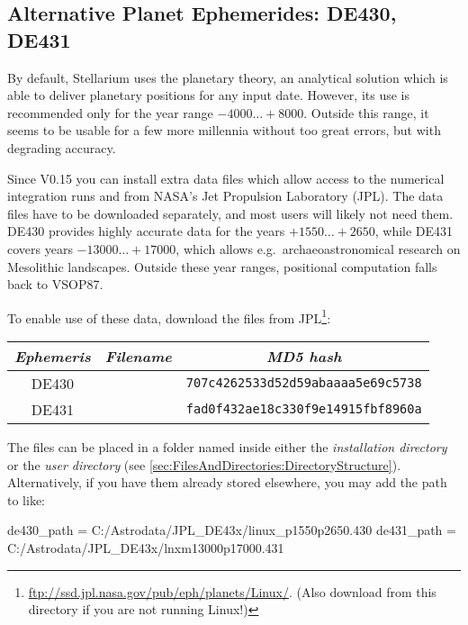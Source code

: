 \subsection{Alternative Planet Ephemerides: DE430, DE431}
\label{sec:ExtraData:ephemerides}

By default, Stellarium uses the  planetary theory,
an analytical solution which is able to deliver planetary positions
for any input date. However, its use is recommended only for the year
range $-4000\ldots+8000$. Outside this range, it seems to be usable
for a few more millennia without too great errors, but with degrading accuracy. 

Since V0.15 you can install extra data files which allow access to the
numerical integration runs  and 
from NASA's Jet Propulsion Laboratory (JPL). The data files have to be
downloaded separately, and most users will likely not need them. DE430
provides highly accurate data for the years $+1550\ldots+2650$, while
DE431 covers years $-13000\ldots+17000$, which allows e.g.\ 
archaeoastronomical research on Mesolithic landscapes. Outside these
year ranges, positional computation falls back to VSOP87.

To enable use of these data, download the files from
JPL\footnote{\url{ftp://ssd.jpl.nasa.gov/pub/eph/planets/Linux/}. (Also
  download from this directory if you are not running Linux!)}:

\begin{tabular}{ccc}
\toprule
\emph{Ephemeris}&\emph{Filename}& \emph{MD5 hash}\\\midrule
DE430& \file{linux\_p1550p2650.430} &\texttt{707c4262533d52d59abaaaa5e69c5738}\\
DE431& \file{lnxm13000p17000.431}   &\texttt{fad0f432ae18c330f9e14915fbf8960a}\\\bottomrule
\end{tabular}


The files can be placed in a folder named  inside either
the \emph{installation directory} or the \emph{user directory}
(see \ref{sec:FilesAndDirectories:DirectoryStructure}). Alternatively,
if you have them already stored elsewhere, you may add the path to
\file{config.ini} like:

\begin{configfile}
[astro]
de430_path = C:/Astrodata/JPL_DE43x/linux_p1550p2650.430
de431_path = C:/Astrodata/JPL_DE43x/lnxm13000p17000.431
\end{configfile}

